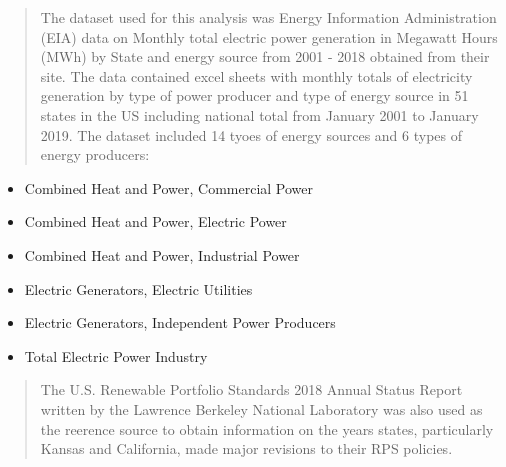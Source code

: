 \documentclass[12pt,]{article}
\providecommand{\tightlist}{%
  \setlength{\itemsep}{0pt}\setlength{\parskip}{0pt}}
\begin{document}
\begin{quote}
The dataset used for this analysis was Energy Information Administration
(EIA) data on Monthly total electric power generation in Megawatt Hours
(MWh) by State and energy source from 2001 - 2018 obtained from their
site. The data contained excel sheets with monthly totals of electricity
generation by type of power producer and type of energy source in 51
states in the US including national total from January 2001 to January
2019. The dataset included 14 tyoes of energy sources and 6 types of
energy producers:
\end{quote}

\begin{itemize}
\tightlist
\item
  Combined Heat and Power, Commercial Power
\item
  Combined Heat and Power, Electric Power
\item
  Combined Heat and Power, Industrial Power
\item
  Electric Generators, Electric Utilities
\item
  Electric Generators, Independent Power Producers
\item
  Total Electric Power Industry
\end{itemize}

\begin{quote}
The U.S. Renewable Portfolio Standards 2018 Annual Status Report written
by the Lawrence Berkeley National Laboratory was also used as the
reerence source to obtain information on the years states, particularly
Kansas and California, made major revisions to their RPS policies.
\end{quote}
\end{document}
